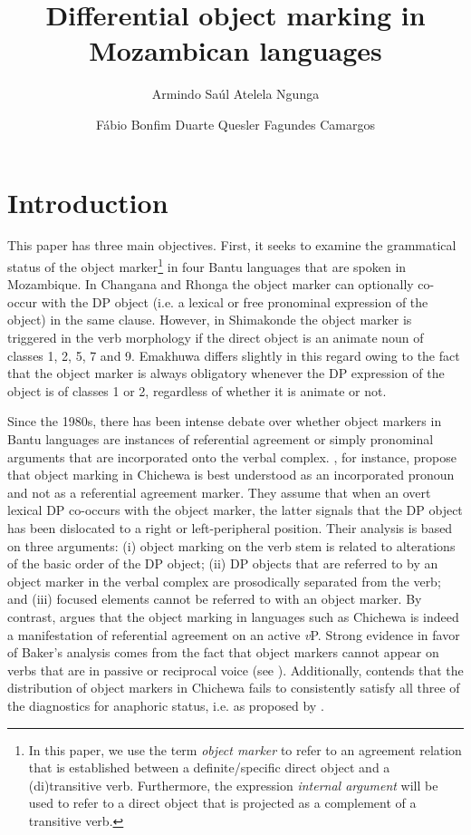 \documentclass[output=paper]{langsci/langscibook}
\title{Differential object marking in Mozambican languages}
\author{%
Armindo Saúl Atelela Ngunga\affiliation{University of Eduardo Mondlane}\and 
Fábio Bonfim Duarte\affiliation{Federal University of Minas Gerais}\lastand 
 Quesler Fagundes Camargos \affiliation{Federal University of Rondônia}
}
\begin{document}
 
 
 

\section{Introduction}

This paper has three main objectives. First, it seeks to examine the grammatical status of the object marker\footnote{ {In this paper, we use the term }{\textit{object marker}} {to refer to an agreement relation that is established between a definite/specific direct object and a (di)transitive verb. Furthermore, the expression }{\textit{internal argument}} {will be used to refer to a direct object that is projected as a complement of a transitive verb.}} in four Bantu languages that are spoken in Mozambique. In Changana and Rhonga the object marker can optionally co-occur with the DP object (i.e. a lexical or free pronominal expression of the object) in the same clause. However, in Shimakonde the object marker is triggered in the verb morphology if the direct object is an animate noun of classes 1, 2, 5, 7 and 9. Emakhuwa differs slightly in this regard owing to the fact that the object marker is always obligatory whenever the DP expression of the object is of classes 1 or 2, regardless of whether it is animate or not.

Since the 1980s, there has been intense debate over whether object markers in Bantu languages are instances of referential agreement or simply pronominal arguments that are incorporated onto the verbal complex. \citet{BresnanMchombo1987}, for instance, propose that object marking in Chichewa is best understood as an incorporated pronoun and not as a referential agreement marker. They assume that when an overt lexical DP co-occurs with the object marker, the latter signals that the DP object has been dislocated to a right or left-peripheral position. Their analysis is based on three arguments: 
(i) object marking on the verb stem is related to alterations of the basic order of the DP object; 
(ii) DP objects that are referred to by an object marker in the verbal complex are prosodically separated from the verb; 
and (iii) focused elements cannot be referred to with an object marker. By contrast, \citet{Baker2008} argues that the object marking in languages such as Chichewa is indeed a manifestation of referential agreement on an active {\textit{v}}P. Strong evidence in favor of Baker’s analysis comes from the fact that object markers cannot appear on verbs that are in passive or reciprocal voice (see ). Additionally, \citet{Downing2014} contends that the distribution of object markers in Chichewa fails to consistently satisfy all three of the diagnostics for anaphoric status, i.e. as proposed by \citet{BresnanMchombo1987}.
\end{document}
